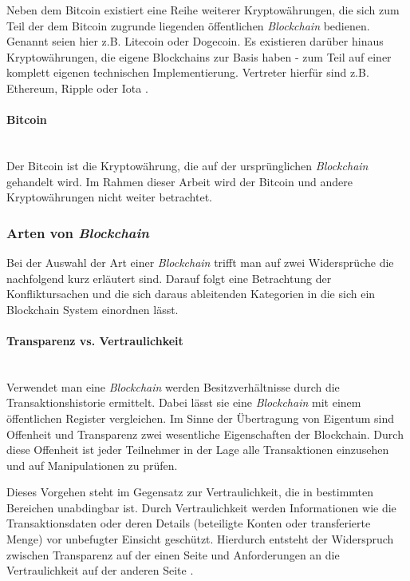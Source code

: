 Neben dem Bitcoin existiert eine Reihe weiterer Kryptowährungen, die sich zum Teil der dem Bitcoin zugrunde liegenden öffentlichen \textit{Blockchain} bedienen. Genannt seien hier z.B. Litecoin oder Dogecoin. Es existieren darüber hinaus Kryptowährungen, die eigene Blockchains zur Basis haben - zum Teil auf einer komplett eigenen technischen Implementierung. Vertreter hierfür sind z.B. Ethereum, Ripple oder Iota \citep[siehe auch][]{Buterin2014, carVertical, JPMorgan2018}.

\paragraph{Bitcoin}$~~$\\
Der Bitcoin ist die Kryptowährung, die auf der ursprünglichen \textit{Blockchain} gehandelt wird. Im Rahmen dieser Arbeit wird der Bitcoin und andere Kryptowährungen nicht weiter betrachtet.

\subsubsection{Arten von \textit{Blockchain}} \label{Arten-von-Blockchain}
Bei der Auswahl der Art einer \textit{Blockchain} trifft man auf zwei Widersprüche die nachfolgend kurz erläutert sind. Darauf folgt eine Betrachtung der Konfliktursachen und die sich daraus ableitenden Kategorien in die sich ein Blockchain System einordnen lässt.

\paragraph{Transparenz vs. Vertraulichkeit}$~~$\\
Verwendet man eine \textit{Blockchain} werden Besitzverhältnisse durch die Transaktionshistorie ermittelt. Dabei lässt sie eine \textit{Blockchain} mit einem öffentlichen Register vergleichen. Im Sinne der Übertragung von Eigentum sind Offenheit und Transparenz zwei wesentliche Eigenschaften der Blockchain. Durch diese Offenheit ist jeder Teilnehmer in der Lage alle Transaktionen einzusehen und auf Manipulationen zu prüfen.

Dieses Vorgehen steht im Gegensatz zur Vertraulichkeit, die in bestimmten Bereichen unabdingbar ist. Durch Vertraulichkeit werden Informationen wie die Transaktionsdaten oder deren Details (beteiligte Konten oder transferierte Menge) vor unbefugter Einsicht geschützt. Hierdurch entsteht der Widerspruch zwischen Transparenz auf der einen Seite und Anforderungen an die Vertraulichkeit auf der anderen Seite \citep{Drescher2017}.

